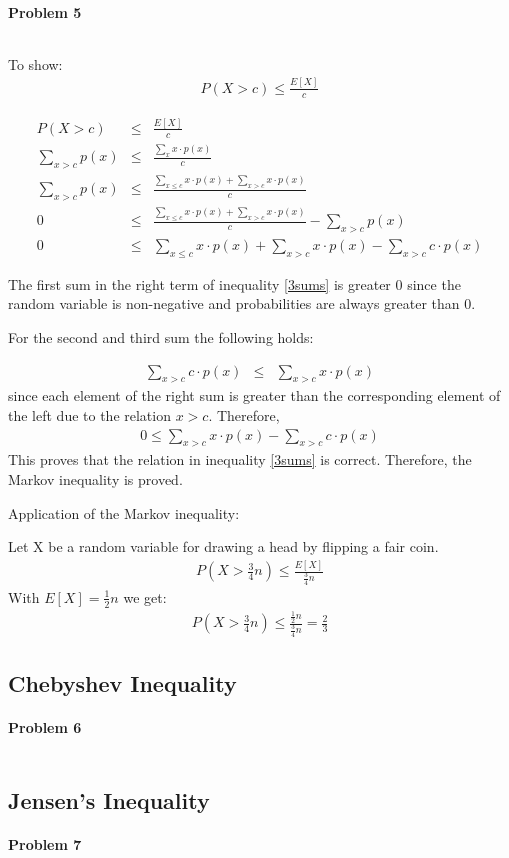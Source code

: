 \documentclass{article}
\begin{document}
\paragraph*{Problem 5}
$\;$ 

To show:
\begin{eqnarray}
P(X > c) \leq \frac{E[X]}{c}
\end{eqnarray}

\begin{eqnarray}
P(X > c) &\leq& \frac{E[X]}{c}\\
\sum_{x>c}{p(x)} &\leq& \frac{\sum_{x}{x \cdot p(x)}}{c}\\
\sum_{x>c}{p(x)} &\leq& \frac{\sum_{x\leq c}{x \cdot p(x)} + \sum_{x>c}{x \cdot p(x)}}{c}\\
0 &\leq& \frac{\sum_{x\leq c}{x \cdot p(x)} + \sum_{x>c}{x \cdot p(x)}}{c} - \sum_{x>c}{p(x)}\\
0 &\leq& \sum_{x\leq c}{x \cdot p(x)} + \sum_{x>c}{x \cdot p(x)} - \sum_{x>c}{ c \cdot p(x)} \label{3sums}
\end{eqnarray}

The first sum in the right term of inequality \ref{3sums} is greater 0 since the random variable is non-negative and probabilities are always greater than 0.

For the second and third sum the following holds:

\begin{eqnarray}
\sum_{x>c}{ c \cdot p(x)} &\leq& \sum_{x>c}{x \cdot p(x)}
\end{eqnarray}
since each element of the right sum is greater than the corresponding element of the left due to the relation $x > c$. Therefore,
\begin{eqnarray}
0 \leq \sum_{x>c}{x \cdot p(x)} - \sum_{x>c}{ c \cdot p(x)}
\end{eqnarray}
This proves that the relation in inequality \ref{3sums} is correct. Therefore, the Markov inequality is proved.

Application of the Markov inequality:

Let X be a random variable for drawing a head by flipping a fair coin.
\begin{eqnarray}
P(X > \frac{3}{4}n) \leq \frac{E[X]}{\frac{3}{4}n}
\end{eqnarray}
With $E[X] = \frac{1}{2}n$ we get:
\begin{eqnarray}
P(X > \frac{3}{4}n) \leq \frac{\frac{1}{2}n}{\frac{3}{4}n} = \frac{2}{3}
\end{eqnarray}


\subsection{Chebyshev Inequality}

\paragraph*{Problem 6}
$\;$ 

\subsection{Jensen's Inequality}

\paragraph*{Problem 7}
$\;$ 
\end{document}
